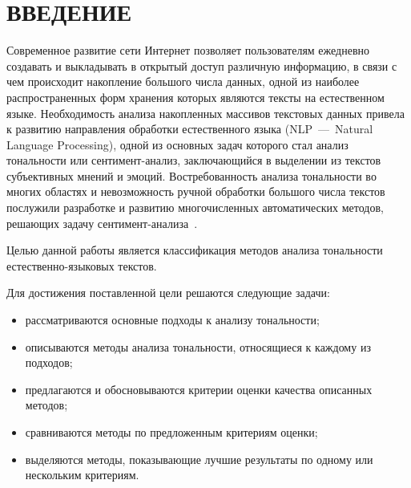 \chapter*{ВВЕДЕНИЕ}

Современное развитие сети Интернет позволяет пользователям ежедневно создавать и
выкладывать в открытый доступ различную информацию, в связи с чем происходит
накопление большого числа данных, одной из наиболее распространенных форм
хранения которых являются тексты на естественном языке. Необходимость анализа
накопленных массивов текстовых данных привела к развитию направления обработки
естественного языка (NLP~---~Natural Language Processing), одной из основных
задач которого стал анализ тональности или сентимент-анализ, заключающийся в
выделении из текстов субъективных мнений и эмоций. Востребованность анализа
тональности во многих областях и невозможность ручной обработки большого числа
текстов послужили разработке и развитию многочисленных автоматических методов,
решающих задачу сентимент-анализа~\cite{article05}.

Целью данной работы является классификация методов анализа тональности
естественно-языковых текстов.

Для достижения поставленной цели решаются следующие задачи:
\begin{itemize}
    \item рассматриваются основные подходы к анализу тональности;
    \item описываются методы анализа тональности, относящиеся к каждому из подходов;
    \item предлагаются и обосновываются критерии оценки качества описанных методов;
    \item сравниваются методы по предложенным критериям оценки;
    \item выделяются методы, показывающие лучшие результаты по одному или
        нескольким критериям.
\end{itemize}
